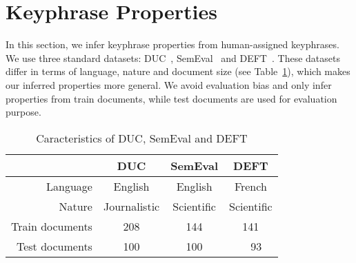 \section{Keyphrase Properties}
\label{sec:keyphrase_properties}
    In this section, we infer keyphrase properties from human-assigned keyphrases.
    We use three standard datasets: DUC~\cite{wan2008expandrank}, SemEval~\cite{kim2010semeval} and DEFT~\cite{paroubek2012deft}.
    These datasets differ in terms of language, nature and document size (see Table~\ref{tab:datasets}), which makes our inferred properties more general.
    We avoid evaluation bias and only infer properties from train documents, while test documents are used for evaluation purpose.
    \begin{table}[!h]
        \centering
        \begin{tabular}{@{}r@{~}|@{~}c@{~~}c@{~~}c@{}}
            \toprule
            & \textbf{DUC} & \textbf{SemEval} & \textbf{DEFT}\\
            \hline
            Language & English & English & French\\
            Nature & Journalistic & Scientific & Scientific\\
            Train documents & 208 & 144 & 141\\
            Test documents & 100 & 100 & ~~93\\
            \bottomrule
        \end{tabular}
        \caption{Caracteristics of DUC, SemEval and DEFT
                 \label{tab:datasets}}
    \end{table}

